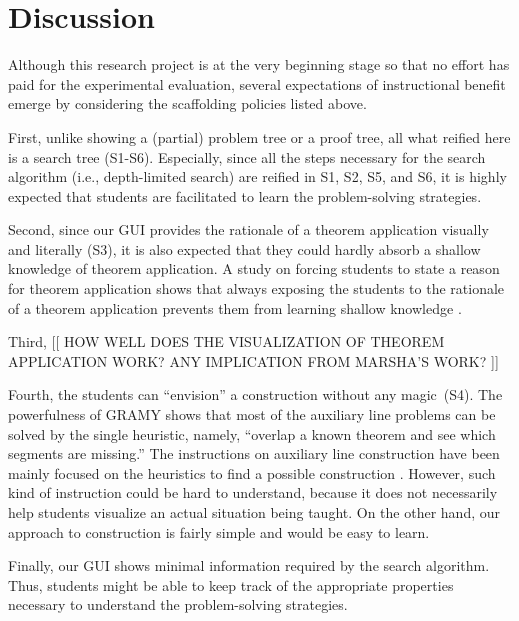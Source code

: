 
\section{Discussion}
\label{sec:discussion}

Although this research project is at the very beginning stage so that no
effort has paid for the experimental evaluation, several expectations of
instructional benefit emerge by considering the scaffolding policies
listed above.

First, unlike showing a (partial) problem tree or a proof tree, all what
reified here is a search tree (S1-S6).  Especially, since all the steps
necessary for the search algorithm (i.e., depth-limited search) are
reified in S1, S2, S5, and S6, it is highly expected that students are
facilitated to learn the problem-solving strategies.

Second, since our GUI provides the rationale of a theorem application
visually and literally (S3), it is also expected that they could hardly
absorb a shallow knowledge of theorem application.  A study on forcing
students to state a reason for theorem application shows that always
exposing the students to the rationale of a theorem application prevents
them from learning shallow knowledge \cite{Aleven98}.

Third, [[ HOW WELL DOES THE VISUALIZATION OF THEOREM APPLICATION WORK?
ANY IMPLICATION FROM MARSHA'S WORK? ]] \cite{Lovett94}

Fourth, the students can ``envision'' a construction without any
magic~(S4).  The powerfulness of GRAMY shows that most of the auxiliary
line problems can be solved by the single heuristic, namely, ``overlap a
known theorem and see which segments are missing.''  The instructions on
auxiliary line construction have been mainly focused on the heuristics
to find a possible construction \cite{Polya57}.  However, such kind of
instruction could be hard to understand, because it does not necessarily
help students visualize an actual situation being taught.  On the other
hand, our approach to construction is fairly simple and would be easy to
learn.

Finally, our GUI shows minimal information required by the search
algorithm.  Thus, students might be able to keep track of the
appropriate properties necessary to understand the problem-solving
strategies.  

